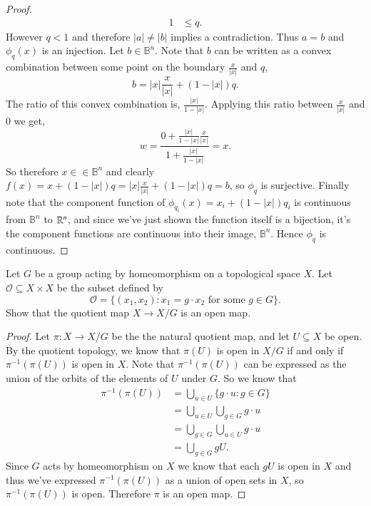 \documentclass[minion]{homework651}
\begin{document}
\begin{problems}
\begin{proof}
\begin{align*}
        1 &\leq q.
    \end{align*}
    However $q < 1$ and therefore $|a| \neq |b|$ implies a contradiction. Thus $a = b$ and $\phi_q(x)$ is an injection. 
    Let $b \in \mathbb B^n$. Note that $b$ can be written as a convex combination between some point on the 
    boundary $\frac{x}{|x|}$ and $q$, 
    \begin{equation*}
        b = |x|\frac{x}{|x|} + (1 - |x|)q. 
    \end{equation*}
    The ratio of this convex combination is, $\frac{|x|}{1 - |x|}$. Applying this ratio between $\frac{x}{|x|}$ and $0$ we get,
    \begin{equation*}
        w = \dfrac{0 + \frac{|x|}{1 - |x|}\frac{x}{|x|}}{1 + \frac{|x|}{1 - |x|}} = x.
    \end{equation*}
    So therefore $x \in \in \mathbb B^n$ and clearly $f(x) = x + (1 - |x|)q =  |x|\frac{x}{|x|} + (1 - |x|)q = b$, so $\phi_q$ is surjective. 
    Finally note that the component function of $\phi_{q_i}(x) = x_i + (1 - |x|)q_i$ is continuous from $\mathbb B^n$ to $\mathbb R^n$, and since we've just 
    shown the function itself is a bijection, it's the component functions are continuous into their image, $\mathbb B^n$. Hence $\phi_q$ is continuous. 


\end{proof}


\problem Let $G$ be a group acting by homeomorphism on a topological space $X$. Let $\mathcal{O} \subseteq X\times X$
be the subset defined by 
\begin{equation*}
    \mathcal{O} = \{(x_1, x_2): x_1 = g \cdot x_2 \text{ for some } g \in G\}.
\end{equation*}
Show that the quotient map $X \to X/G$ is an open map. 
\begin{proof} Let $\pi: X \to X/G$ be the the natural quotient map, and let $U \subseteq X$ be open.  By the quotient topology, we 
    know that $\pi(U)$ is open in $X/G$ if and only if $\pi^{-1}(\pi(U))$ is open in $X$. Note that $\pi^{-1}(\pi(U))$ can be expressed as 
    the union of the orbits of the elements of $U$ under $G$. So we know that
    \begin{align*}
        \pi^{-1}(\pi(U)) &=\bigcup_{u \in U} \{g \cdot u: g \in G\}\\
        &=\bigcup_{u \in U} \bigcup_{g \in G} g \cdot u \\
        &=\bigcup_{g \in G} \bigcup_{u \in U} g \cdot u \\
        &=\bigcup_{g \in G} gU.
    \end{align*}
    Since $G$ acts by homeomorphism on $X$ we know that each $gU$ is open in $X$ and thus 
    we've expressed $\pi^{-1}(\pi(U))$ as a union of open sets in $X$, so $\pi^{-1}(\pi(U))$ is open. Therefore $\pi$ is an open map. 
\end{proof}

\end{problems}
\end{document}
